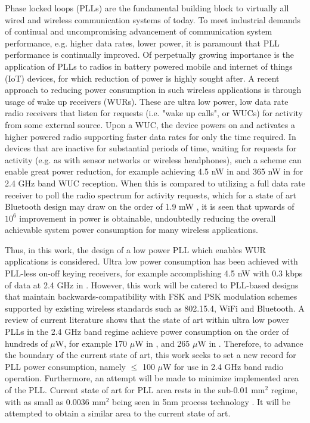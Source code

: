 Phase locked loops (PLLs) are the fundamental building block to virtually all wired and wireless communication systems of today. To meet industrial demands of continual and uncompromising advancement of communication system performance, e.g. higher data rates, lower power, it is paramount that PLL performance is continually improved. Of perpetually growing importance is the application of PLLs to radios in battery powered mobile and internet of things (IoT) devices, for which reduction of power is highly sought after. A recent approach to reducing power consumption in such wireless applications is through usage of wake up receivers (WURs). These are ultra low power, low data rate radio receivers that listen for requests (i.e. "wake up calls", or WUCs) for activity from some external source. Upon a WUC, the device powers on and activates a higher powered radio supporting faster data rates for only the time required. In devices that are inactive for substantial periods of time, waiting for requests for activity (e.g. as with sensor networks or wireless headphones), such a scheme can enable great power reduction, for example achieving 4.5 nW in \cite{Jiang2017} and 365 nW in \cite{Sadagopan2017} for 2.4 GHz band WUC reception. When this is compared to utilizing a full data rate receiver to poll the radio spectrum for activity requests, which for a state of art Bluetooth design may draw on the order of 1.9 mW \cite{Tamura2020}, it is seen that upwards of $10^6$ improvement in power is obtainable, undoubtedly reducing the overall achievable system power consumption for many wireless applications.

Thus, in this work, the design of a low power PLL which enables WUR applications is considered. Ultra low power consumption has been achieved with PLL-less on-off keying receivers, for example accomplishing 4.5 nW with 0.3 kbps of data at 2.4 GHz in \cite{Jiang2017}. However, this work will be catered to PLL-based designs that maintain backwards-compatibility with FSK and PSK modulation schemes supported by existing wireless standards such as 802.15.4, WiFi and Bluetooth. A review of current literature shows that the state of art within ultra low power PLLs in the 2.4 GHz band regime achieve power consumption on the order of hundreds of $\mu$W, for example 170 $\mu$W in \cite{Zhang2019}, and 265 $\mu$W in \cite{Liu2019}. Therefore, to advance the boundary of the current state of art, this work seeks to set a new record for PLL power consumption, namely $\leq$ 100 $\mu$W for use in 2.4 GHz band radio operation. Furthermore, an attempt will be made to minimize implemented area of the PLL. Current state of art for PLL area rests in the sub-0.01 mm$^2$ regime, with as small as 0.0036 mm$^2$ being seen in 5nm process technology \cite{Liu2020}. It will be attempted to obtain a similar area to the current state of art.


